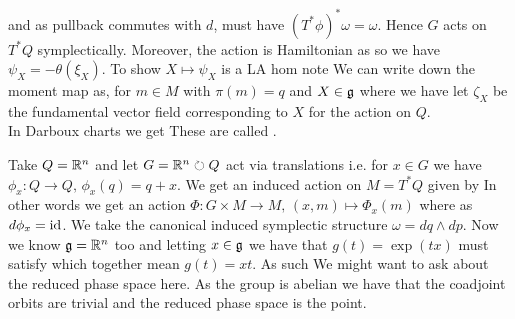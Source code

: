 \documentclass{article}
\begin{document}
\begin{example}
and as pullback commutes with $d$, must have $(T^\ast \phi)^\ast \omega = \omega$. Hence $G$ acts on $T^\ast Q$ symplectically. Moreover, the action is Hamiltonian as 
so we have $\psi_X = -\theta(\xi_X)$. To show $X \mapsto \psi_X$ is a LA hom note 
We can write down the moment map as, for $m \in M$ with $\pi(m)=q$ and $X \in \mathfrak{g}$ 
where we have let $\zeta_X$ be the fundamental vector field corresponding to $X$ for the action on $Q$. \\
In Darboux charts we get 
These are called . 
\end{example}

\begin{example}
Take $Q = \mathbb{R}^n$ and let $G = \mathbb{R}^n \circlearrowright Q$ act via translations i.e. for $x \in G$ we have $\phi_x:Q \to Q, \, \phi_x(q) = q+x$. We get an induced action on $M = T^\ast Q$ given by 
In other words we get an action $\Phi : G \times M \to M, \, (x,m) \mapsto \Phi_x(m)$ where 
as $d\phi_x = \operatorname{id}$. We take the canonical induced symplectic structure $\omega = dq \wedge dp$. Now we know $\mathfrak{g} = \mathbb{R}^n$ too and letting $x \in \mathfrak{g}$ we have that $g(t) = \exp(tx)$ must satisfy 
which together mean $g(t) = xt$. As such 
We might want to ask about the reduced phase space here. As the group is abelian we have that the coadjoint orbits are trivial and the reduced phase space is 
the point.
\end{example}
\end{document}
